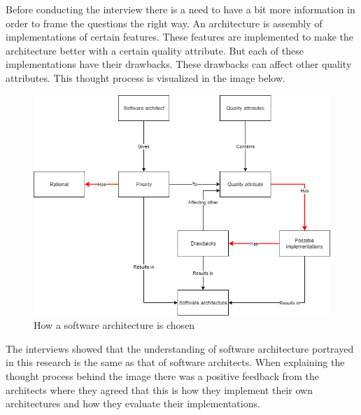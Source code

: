 Before conducting the interview there is a need to have a bit more information in order to frame the questions the right way. An architecture is assembly of implementations of certain features. These features are implemented to make the architecture better with a certain quality attribute. But each of these implementations have their drawbacks. These drawbacks can affect other quality attributes. This thought process is visualized in the image below.

\begin{figure}[H]
	\includegraphics[width=\linewidth]{creating_architecture.png}
	\caption{How a software architecture is chosen}
\end{figure}

The interviews showed that the understanding of software architecture portrayed in this research is the same as that of software architects. When explaining the thought process behind the image there was a positive feedback from the architects where they agreed that this is how they implement their own architectures and how they evaluate their implementations.
